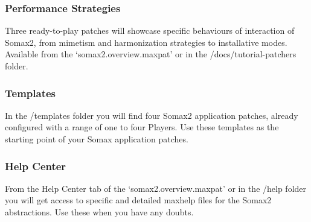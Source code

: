\subsubsection{Performance Strategies}

Three ready-to-play patches will showcase specific behaviours of interaction of Somax2, from mimetism and harmonization strategies to installative modes. Available from the `somax2.overview.maxpat' or in the /docs/tutorial-patchers folder.

\subsubsection{Templates}

In the /templates folder you will find four Somax2 application patches, already configured with a range of one to four Players.
Use these templates as the starting point of your Somax application patches.

\subsubsection{Help Center}

From the Help Center tab of the `somax2.overview.maxpat' or in the /help folder you will get access to specific and detailed maxhelp files for the Somax2 abstractions. Use these when you have any doubts. 

